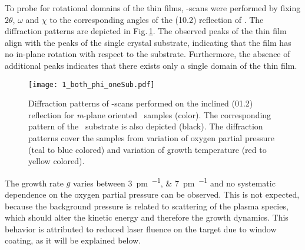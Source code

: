 To probe for rotational domains of the thin films, \textphi-scans were performed by fixing $2\theta$, $\omega$ and $\chi$ to the corresponding angles of the (10.2) reflection of \cro.
The diffraction patterns are depicted in Fig.\,\ref{Fig:Results_1_phiScan}.
The observed peaks of the thin film align with the peaks of the single crystal substrate, indicating that the film has no in-plane rotation with respect to the substrate.
Furthermore, the absence of additional peaks indicates that there exists only a single domain of the thin film.
\begin{figure}
    \centering
    \texttt{[image: 1\_both\_phi\_oneSub.pdf]}
    \caption{
        Diffraction patterns of \textphi-scans performed on the inclined (01.2) reflection for \textit{m}-plane oriented \cro\ samples (color).
        The corresponding pattern of the \alo\ substrate is also depicted (black).
        The diffraction patterns cover the samples from variation of oxygen partial pressure (teal to blue colored) and variation of growth temperature (red to yellow colored).
    }
    \label{Fig:Results_1_phiScan}
\end{figure}

The growth rate $g$ varies between \qtylist{3;7}{\pm\per\pulse} and no systematic dependence on the oxygen partial pressure can be observed.
This is not expected, because the background pressure is related to scattering of the plasma species, which should alter the kinetic energy and therefore the growth dynamics.
This behavior is attributed to reduced laser fluence on the target due to window coating, as it will be explained below.

